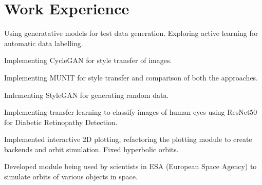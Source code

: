 \documentclass[a4paper]{deedy-resume-openfont}
\begin{document}
\begin{minipage}[t]{0.66\textwidth} 




\section{Work Experience}
\vspace{\topsep} %
\begin{tightemize}
\item Using generatative models for test data generation. Exploring active learning for automatic data labelling.
\item Implementing CycleGAN for style transfer of images. 
\item Implementing MUNIT for style transfer and comparison of both the approaches.
\item Imlementing StyleGAN for generating random data.
\end{tightemize}

\vspace{\topsep} %
\begin{tightemize}
\item Implementing transfer learning to classify images of human eyes using ResNet50 for Diabetic Retinopathy Detection.
\end{tightemize}


\begin{tightemize}
\item Implemented interactive 2D plotting, refactoring the plotting module to create backends and orbit simulation. Fixed hyperbolic orbits.
\item Developed module being used by scientists in ESA (European Space Agency) to simulate orbits of various objects in space.


\end{tightemize}
\end{minipage}
\end{document}
